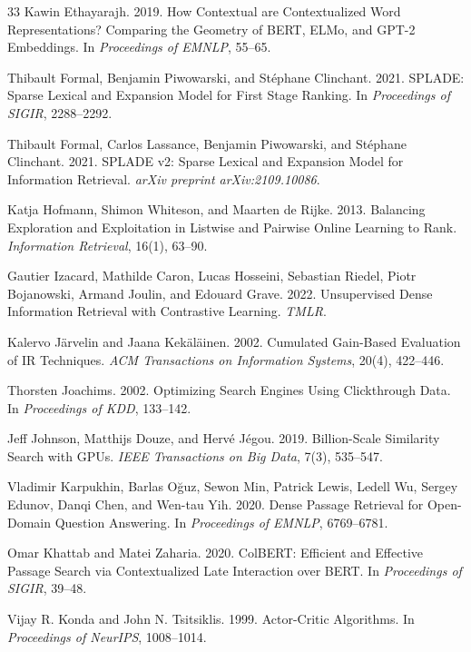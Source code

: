 \documentclass[sigconf]{acmart}
\begin{document}
\begin{thebibliography}{33}
Kawin Ethayarajh. 2019. How Contextual are Contextualized Word Representations? Comparing the Geometry of BERT, ELMo, and GPT-2 Embeddings. In \textit{Proceedings of EMNLP}, 55--65.

Thibault Formal, Benjamin Piwowarski, and St\'ephane Clinchant. 2021. SPLADE: Sparse Lexical and Expansion Model for First Stage Ranking. In \textit{Proceedings of SIGIR}, 2288--2292.

Thibault Formal, Carlos Lassance, Benjamin Piwowarski, and St\'ephane Clinchant. 2021. SPLADE v2: Sparse Lexical and Expansion Model for Information Retrieval. \textit{arXiv preprint arXiv:2109.10086}.

Katja Hofmann, Shimon Whiteson, and Maarten de Rijke. 2013. Balancing Exploration and Exploitation in Listwise and Pairwise Online Learning to Rank. \textit{Information Retrieval}, 16(1), 63--90.

Gautier Izacard, Mathilde Caron, Lucas Hosseini, Sebastian Riedel, Piotr Bojanowski, Armand Joulin, and Edouard Grave. 2022. Unsupervised Dense Information Retrieval with Contrastive Learning. \textit{TMLR}.

Kalervo J\"arvelin and Jaana Kek\"al\"ainen. 2002. Cumulated Gain-Based Evaluation of IR Techniques. \textit{ACM Transactions on Information Systems}, 20(4), 422--446.

Thorsten Joachims. 2002. Optimizing Search Engines Using Clickthrough Data. In \textit{Proceedings of KDD}, 133--142.

Jeff Johnson, Matthijs Douze, and Herv\'e J\'egou. 2019. Billion-Scale Similarity Search with GPUs. \textit{IEEE Transactions on Big Data}, 7(3), 535--547.

Vladimir Karpukhin, Barlas O\u{g}uz, Sewon Min, Patrick Lewis, Ledell Wu, Sergey Edunov, Danqi Chen, and Wen-tau Yih. 2020. Dense Passage Retrieval for Open-Domain Question Answering. In \textit{Proceedings of EMNLP}, 6769--6781.

Omar Khattab and Matei Zaharia. 2020. ColBERT: Efficient and Effective Passage Search via Contextualized Late Interaction over BERT. In \textit{Proceedings of SIGIR}, 39--48.

Vijay R. Konda and John N. Tsitsiklis. 1999. Actor-Critic Algorithms. In \textit{Proceedings of NeurIPS}, 1008--1014.


\end{thebibliography}
\end{document}
